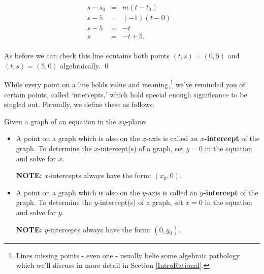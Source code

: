 \documentclass{ximera}
\begin{document}
\begin{example}
\begin{enumerate}
\[\begin{array}{rclr} 
s - s_0 & = & m\left(t - t_0\right)  & \\
s - 5 & = & (-1) \left(t -0 \right) & \\
s- 5 & = &-t & \\
s& = & -t + 5.\\
\end{array} \]

\enlargethispage{.1in}

As before we can check this line contains both points $(t,s) = (0,5)$ and $(t,s) = (5,0)$ algebraically.  \qed

\end{enumerate}

\end{example}

While every point on a line holds value and meaning,\footnote{Lines missing points  - even one - usually belie some algebraic pathology which we'll discuss in more detail in Section \ref{IntroRational}.} we've reminded you of certain points, called `intercepts,' which hold special enough significance to be singled out. Formally, we define these as follows.

 


% 

\begin{definition}  Given a graph of an equation in the $xy$-plane:

\label{interceptsdefn}

\begin{itemize}

\item  A point on a graph which is also on the $x$-axis is called an  \textbf{\boldmath $x$-intercept} of the graph.  To determine the $x$-intercept(s) of a graph, set $y = 0$ in the equation and solve for $x$.

\textbf{NOTE:}  $x$-intercepts always have the form:  $(x_0,0)$.

\item  A point on a graph which is also on the $y$-axis is called an  \textbf{\boldmath $y$-intercept} of the graph. To determine the $y$-intercept(s) of a graph, set $x = 0$ in the equation and solve for $y$.

\textbf{NOTE:}  $y$-intercepts always have the form:  $(0,y_0)$.

\end{itemize}

\end{definition}
\end{document}
